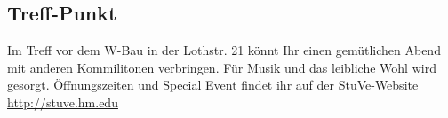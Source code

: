 \subsection{Treff-Punkt}
Im Treff vor dem W-Bau in der Lothstr. 21 könnt 
Ihr einen gemütlichen Abend mit anderen 
Kommilitonen verbringen. Für Musik und das 
leibliche Wohl wird gesorgt.\doublebreak
Öffnungszeiten und Special Event findet ihr auf der StuVe-Website 
\url{http://stuve.hm.edu}
